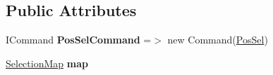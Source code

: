 \subsection*{Public Attributes}
\begin{DoxyCompactItemize}
\item 
\mbox{\label{class_tutor_scout24_1_1_view_models_1_1_create_view_model_a8479f4d285e9b743085a037d59fd1c25}} 
I\+Command {\bfseries Pos\+Sel\+Command} =$>$ new Command(\mbox{\hyperlink{class_tutor_scout24_1_1_view_models_1_1_create_view_model_a5002145ea2bc96424f202caee461f810}{Pos\+Sel}})
\item 
\mbox{\label{class_tutor_scout24_1_1_view_models_1_1_create_view_model_aad8f0b81c0749f3ffef8ea25c97370ad}} 
\mbox{\hyperlink{class_tutor_scout24_1_1_controls_1_1_selection_map}{Selection\+Map}} {\bfseries map}
\end{DoxyCompactItemize}
